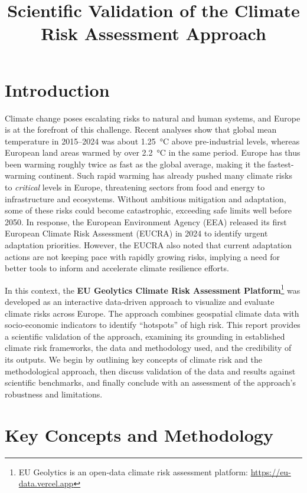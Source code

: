 \documentclass[10pt, conference]{IEEEtran}
\begin{document}
\title{Scientific Validation of the Climate Risk Assessment Approach}
\author{ }
\maketitle

\section{Introduction}
Climate change poses escalating risks to natural and human systems, and Europe is at the forefront of this challenge. Recent analyses show that global mean temperature in 2015–2024 was about 1.25~°C above pre-industrial levels, whereas European land areas warmed by over 2.2~°C in the same period. Europe has thus been warming roughly twice as fast as the global average, making it the fastest-warming continent. Such rapid warming has already pushed many climate risks to \textit{critical} levels in Europe, threatening sectors from food and energy to infrastructure and ecosystems. Without ambitious mitigation and adaptation, some of these risks could become catastrophic, exceeding safe limits well before 2050. In response, the European Environment Agency (EEA) released its first European Climate Risk Assessment (EUCRA) in 2024 to identify urgent adaptation priorities. However, the EUCRA also noted that current adaptation actions are not keeping pace with rapidly growing risks, implying a need for better tools to inform and accelerate climate resilience efforts.

In this context, the \textbf{EU Geolytics Climate Risk Assessment Platform}\footnote{EU Geolytics is an open-data climate risk assessment platform: \url{https://eu-data.vercel.app}} was developed as an interactive data-driven approach to visualize and evaluate climate risks across Europe. The approach combines geospatial climate data with socio-economic indicators to identify “hotspots” of high risk. This report provides a scientific validation of the approach, examining its grounding in established climate risk frameworks, the data and methodology used, and the credibility of its outputs. We begin by outlining key concepts of climate risk and the methodological approach, then discuss validation of the data and results against scientific benchmarks, and finally conclude with an assessment of the approach’s robustness and limitations.

\section{Key Concepts and Methodology}
\end{document}
